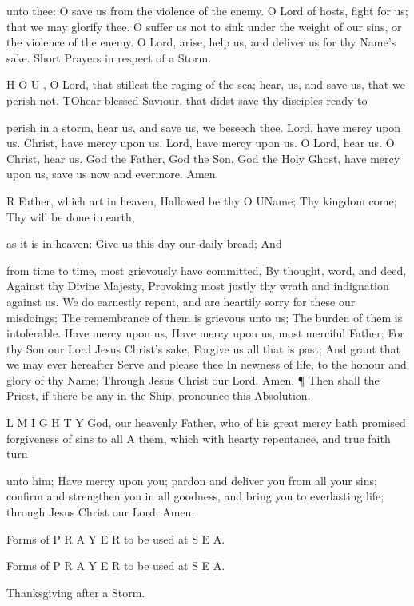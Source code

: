 unto thee: O save us from the violence of the enemy. O Lord of hosts, fight for us; that we may glorify thee. O suffer us not to sink under the weight of our sins, or the violence of the enemy. O Lord, arise, help us, and deliver us for thy Name’s sake. Short Prayers in respect of a Storm.

H O U , O Lord, that stillest the raging of the sea; hear, us, and save us, that we perish not. TOhear blessed Saviour, that didst save thy disciples ready to

perish in a storm, hear us, and save us, we beseech thee. Lord, have mercy upon us. Christ, have mercy upon us. Lord, have mercy upon us. O Lord, hear us. O Christ, hear us. God the Father, God the Son, God the Holy Ghost, have mercy upon us, save us now and evermore. Amen.

R Father, which art in heaven, Hallowed be thy O UName; Thy kingdom come; Thy will be done in earth,

as it is in heaven: Give us this day our daily bread; And

from time to time, most grievously have committed, By thought, word, and deed, Against thy Divine Majesty, Provoking most justly thy wrath and indignation against us. We do earnestly repent, and are heartily sorry for these our misdoings; The remembrance of them is grievous unto us; The burden of them is intolerable. Have mercy upon us, Have mercy upon us, most merciful Father; For thy Son our Lord Jesus Christ’s sake, Forgive us all that is past; And grant that we may ever hereafter Serve and please thee In newness of life, to the honour and glory of thy Name; Through Jesus Christ our Lord. Amen. ¶ Then shall the Priest, if there be any in the Ship, pronounce this Absolution.

L M I G H T Y God, our heavenly Father, who of his great mercy hath promised forgiveness of sins to all A them, which with hearty repentance, and true faith turn

unto him; Have mercy upon you; pardon and deliver you from all your sins; confirm and strengthen you in all goodness, and bring you to everlasting life; through Jesus Christ our Lord. Amen.

Forms of P R A Y E R to be used at S E A.

Forms of P R A Y E R to be used at S E A.

Thanksgiving after a Storm.

